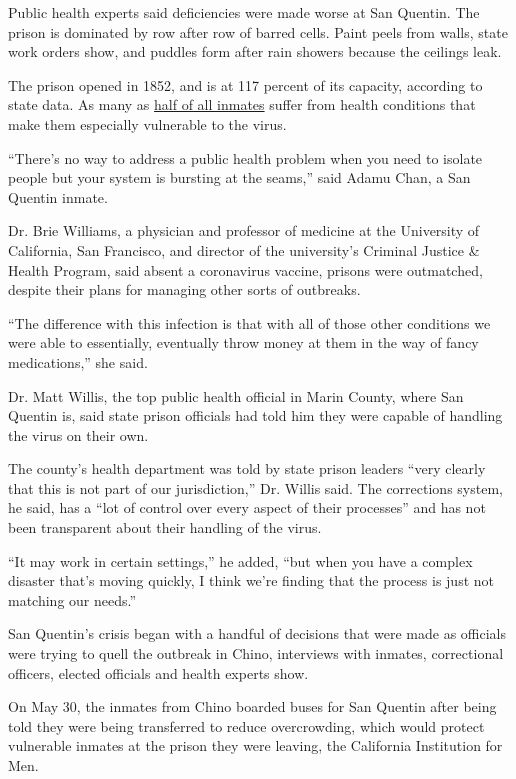 Public health experts said deficiencies were made worse at San Quentin.
The prison is dominated by row after row of barred cells. Paint peels
from walls, state work orders show, and puddles form after rain showers
because the ceilings leak.

The prison opened in 1852, and is at 117 percent of its capacity,
according to state data. As many as
\href{https://cchcs.ca.gov/wp-content/uploads/sites/60/QM/Public-Dashboard-2019-10.pdf}{half
of all inmates} suffer from health conditions that make them especially
vulnerable to the virus.

``There's no way to address a public health problem when you need to
isolate people but your system is bursting at the seams,'' said Adamu
Chan, a San Quentin inmate.

Dr. Brie Williams, a physician and professor of medicine at the
University of California, San Francisco, and director of the
university's Criminal Justice \& Health Program, said absent a
coronavirus vaccine, prisons were outmatched, despite their plans for
managing other sorts of outbreaks.

``The difference with this infection is that with all of those other
conditions we were able to essentially, eventually throw money at them
in the way of fancy medications,'' she said.

Dr. Matt Willis, the top public health official in Marin County, where
San Quentin is, said state prison officials had told him they were
capable of handling the virus on their own.

The county's health department was told by state prison leaders ``very
clearly that this is not part of our jurisdiction,'' Dr. Willis said.
The corrections system, he said, has a ``lot of control over every
aspect of their processes'' and has not been transparent about their
handling of the virus.

``It may work in certain settings,'' he added, ``but when you have a
complex disaster that's moving quickly, I think we're finding that the
process is just not matching our needs.''

San Quentin's crisis began with a handful of decisions that were made as
officials were trying to quell the outbreak in Chino, interviews with
inmates, correctional officers, elected officials and health experts
show.

On May 30, the inmates from Chino boarded buses for San Quentin after
being told they were being transferred to reduce overcrowding, which
would protect vulnerable inmates at the prison they were leaving, the
California Institution for Men.


